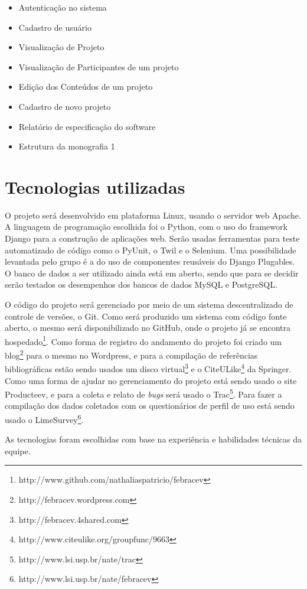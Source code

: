 \documentclass[a4paper,12pt,font=plain,header=plain]{abnt}
\begin{document}
	\begin{itemize}
	 \item Autenticação no sistema
	 \item Cadastro de usuário
	 \item Visualização de Projeto
	 \item Visualização de Participantes de um projeto
	 \item Edição dos Conteúdos de um projeto
	 \item Cadastro de novo projeto
	 \item Relatório de especificação do software
	 \item Estrutura da monografia 1
	\end{itemize}


  \section{Tecnologias utilizadas}
    O projeto será desenvolvido em plataforma Linux, usando o servidor web Apache. A linguagem de programação escolhida foi o Python, com o uso do framework Django para a construção de aplicações web. Serão usadas ferramentas para teste automatizado de código como o PyUnit, o Twil e o Selenium. Uma possibilidade levantada pelo grupo é a do uso de componentes reusáveis do Django Plugables. O banco de dados a ser utilizado ainda está em aberto, sendo que para se decidir serão testados os desempenhos dos bancos de dados MySQL e PostgreSQL.

    O código do projeto será gerenciado por meio de um sistema descentralizado de controle de versões, o Git. Como será produzido um sistema com código fonte aberto, o mesmo será disponibilizado no GitHub, onde o projeto já se encontra hospedado\footnote{http://www.github.com/nathaliaspatricio/febracev}. Como forma de registro do andamento do projeto foi criado um blog\footnote{http://febracev.wordpress.com} para o mesmo no Wordpress, e para a compilação de referências bibliográficas estão sendo usados um disco virtual\footnote{http://febracev.4shared.com} e o CiteULike\footnote{http://www.citeulike.org/groupfunc/9663} da Springer. Como uma forma de ajudar no gerenciamento do projeto está sendo usado o site Producteev, e para a coleta e relato de \textit{bugs} será usado o Trac\footnote{http://www.lsi.usp.br/nate/trac}. Para fazer a compilação dos dados coletados com os questionários de perfil de uso está sendo usado o LimeSurvey\footnote{http://www.lsi.usp.br/nate/febracev}.

    As tecnologias foram escolhidas com base na experiência e habilidades técnicas da equipe.
\end{document}
